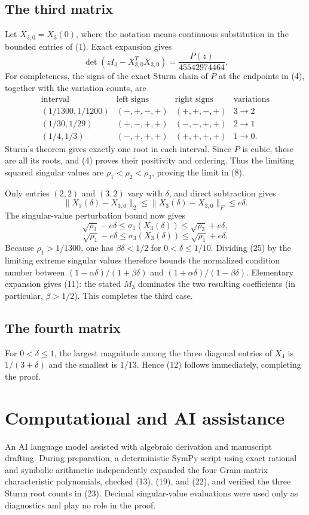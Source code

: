 \documentclass[11pt]{article}
\newcommand{\norm}[1]{\lVert#1\rVert_2}
\begin{document}
\subsection*{The third matrix}

Let $X_{3,0}=X_3(0)$, where the notation means continuous substitution in
the bounded entries of (1).  Exact expansion gives
\[
\det(zI_3-X_{3,0}^TX_{3,0})=\frac{P(z)}{45542974464}.
\tag{22}
\]
For completeness, the signs of the exact Sturm chain of $P$ at the endpoints
in (4), together with the variation counts, are
\[
\begin{array}{c|c|c|c}
\text{interval}&\text{left signs}&\text{right signs}&\text{variations}\\ \hline
(1/1300,1/1200)&(-,+,-,+)&(+,+,-,+)&3\to2\\
(1/30,1/29)&(+,-,+,+)&(-,-,+,+)&2\to1\\
(1/4,1/3)&(-,+,+,+)&(+,+,+,+)&1\to0.
\end{array}
\tag{23}
\]
Sturm's theorem gives exactly one root in each interval.  Since $P$ is cubic,
these are all its roots, and (4) proves their positivity and ordering.  Thus
the limiting squared singular values are $\rho_1<\rho_2<\rho_3$, proving the
limit in (8).

Only entries $(2,2)$ and $(3,2)$ vary with $\delta$, and direct subtraction
gives
\[
\norm{X_3(\delta)-X_{3,0}}
\leq\lVert X_3(\delta)-X_{3,0}\rVert_F
\leq e\delta.
\tag{24}
\]
The singular-value perturbation bound now gives
\[
\sqrt{\rho_3}-e\delta\leq\sigma_1(X_3(\delta))
\leq\sqrt{\rho_3}+e\delta,
\]
\[
\sqrt{\rho_1}-e\delta\leq\sigma_3(X_3(\delta))
\leq\sqrt{\rho_1}+e\delta.
\tag{25}
\]
Because $\rho_1>1/1300$, one has $\beta\delta<1/2$ for
$0<\delta\leq1/10$.  Dividing (25) by the limiting extreme singular values
therefore bounds the normalized condition number between
$(1-\alpha\delta)/(1+\beta\delta)$ and
$(1+\alpha\delta)/(1-\beta\delta)$.  Elementary expansion gives (11): the
stated $M_3$ dominates the two resulting coefficients (in particular,
$\beta>1/2$).  This completes the third case.

\subsection*{The fourth matrix}

For $0<\delta\leq1$, the largest magnitude among the three diagonal entries
of $X_4$ is $1/(3+\delta)$ and the smallest is $1/13$.  Hence (12) follows
immediately, completing the proof.

\section*{Computational and AI assistance}

An AI language model assisted with algebraic derivation and manuscript
drafting.  During preparation, a deterministic SymPy script using exact
rational and symbolic arithmetic independently expanded the four Gram-matrix
characteristic polynomials, checked (13), (19), and (22), and verified the
three Sturm root counts in (23).  Decimal singular-value evaluations were used
only as diagnostics and play no role in the proof.



\end{document}
